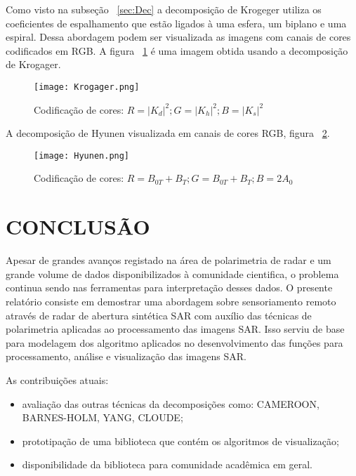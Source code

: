 \documentclass[a4paper,12pt]{article}
\begin{document}
Como visto na subseção ~\ref{sec:Dec} a decomposição de Krogeger utiliza os coeficientes de espalhamento que estão ligados à uma esfera, um biplano e uma espiral. Dessa abordagem podem ser visualizada as imagens com canais de cores codificados em RGB. A figura ~\ref{fig:Krogager} é uma imagem obtida usando a decomposição de Krogager.

\begin{figure}[H]
	\centering
	\texttt{[image: Krogager.png]}
	\caption{Codificação de cores: $R=|K_{d}|^2; G=|K_{h}|^2; B=|K_{s}|^2$}
	\label{fig:Krogager}
\end{figure}

\newpage

A decomposição de Hyunen visualizada em canais de cores RGB, figura ~\ref{fig:Hyunen}.

\begin{figure}[H]
	\centering
	\texttt{[image: Hyunen.png]}
	\caption{Codificação de cores: $R=B_{0T}+B_{T}; G=B_{0T}+B_{T}; B=2A_{0}$}
	\label{fig:Hyunen}
\end{figure}

\newpage
\section{CONCLUSÃO}

Apesar de grandes avanços registado na área de polarimetria de radar e um grande volume de dados disponibilizados à comunidade cientifica, o problema continua sendo nas ferramentas para interpretação desses dados. O presente relatório consiste em demostrar uma abordagem sobre sensoriamento remoto através de radar de abertura sintética SAR com auxílio das técnicas de polarimetria aplicadas ao processamento das imagens SAR. Isso serviu de base para modelagem dos algoritmo aplicados no desenvolvimento das funções para processamento, análise e visualização das imagens SAR.

As contribuições atuais: 

\begin{itemize}
    \item avaliação das outras técnicas da decomposições como:  CAMEROON, BARNES-HOLM, YANG, CLOUDE;
    \item prototipação de uma biblioteca que contém os algoritmos de visualização;
    \item disponibilidade da biblioteca para comunidade acadêmica em geral.  
\end{itemize}

\newpage


\end{document}
